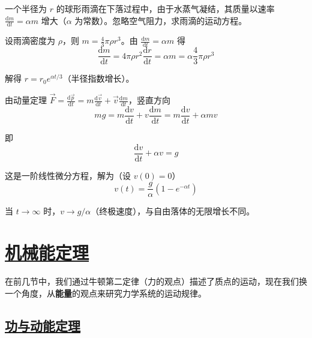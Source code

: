 \begin{example}
    一个半径为 $r$ 的球形雨滴在下落过程中，由于水蒸气凝结，其质量以速率 $\frac{\mathrm{d}m}{\mathrm{d}t} = \alpha m$ 增大（$\alpha$ 为常数）。忽略空气阻力，求雨滴的运动方程。
    \begin{solution}
        设雨滴密度为 $\rho$，则 $m = \frac{4}{3}\pi\rho r^3$。由 $\frac{\mathrm{d}m}{\mathrm{d}t} = \alpha m$ 得
        \begin{equation}
            \frac{\mathrm{d}m}{\mathrm{d}t} = 4\pi\rho r^2\frac{\mathrm{d}r}{\mathrm{d}t} = \alpha m = \alpha\frac{4}{3}\pi\rho r^3
        \end{equation}
        
        解得 $r = r_0 e^{\alpha t/3}$（半径指数增长）。
        
        由动量定理 $\vec{F} = \frac{\mathrm{d}\vec{p}}{\mathrm{d}t} = m\frac{\mathrm{d}\vec{v}}{\mathrm{d}t} + \vec{v}\frac{\mathrm{d}m}{\mathrm{d}t}$，竖直方向
        \begin{equation}
            mg = m\frac{\mathrm{d}v}{\mathrm{d}t} + v\frac{\mathrm{d}m}{\mathrm{d}t} = m\frac{\mathrm{d}v}{\mathrm{d}t} + \alpha mv
        \end{equation}
        
        即
        \begin{equation}
            \frac{\mathrm{d}v}{\mathrm{d}t} + \alpha v = g
        \end{equation}
        
        这是一阶线性微分方程，解为（设 $v(0) = 0$）
        \begin{equation}
            v(t) = \frac{g}{\alpha}(1 - e^{-\alpha t})
        \end{equation}
        
        当 $t \to \infty$ 时，$v \to g/\alpha$（终极速度），与自由落体的无限增长不同。
    \end{solution}
\end{example}


\newpage
\section{\protect\hyperlink{:}{机械能定理}}

在前几节中，我们通过牛顿第二定律（力的观点）描述了质点的运动，现在我们换一个角度，从\textbf{能量}的观点来研究力学系统的运动规律。

\subsection{\protect\hyperlink{:}{功与动能定理}}

